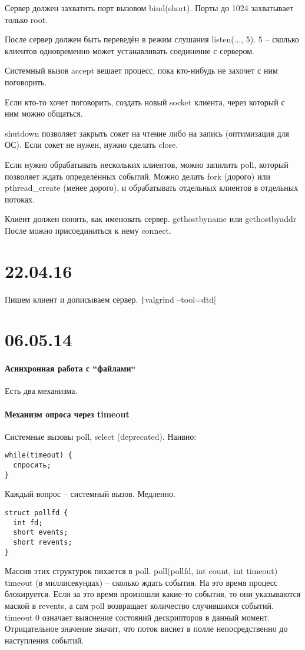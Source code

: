 \documentclass[a4paper,10pt]{article}
\newcommand{\bash}{\texttt}
\begin{document}
Сервер должен захватить порт вызовом bind(short). Порты до 1024 захватывает только root.

После сервер должен быть переведён в режим слушания listen(..., 5). 5 -- сколько клиентов одновременно может устанавливать соединение с сервером.

Системный вызов accept вешает процесс, пока кто-нибудь не захочет с ним поговорить.

Если кто-то хочет поговорить, создать новый socket клиента, через который с ним можно общаться.

shutdown позволяет закрыть сокет на чтение либо на запись (оптимизация для ОС).
Если сокет не нужен, нужно сделать close.

Если нужно обрабатывать нескольких клиентов, можно запилить poll, который позволяет ждать определённых событий. 
Можно делать fork (дорого) или pthread\_create (менее дорого), и обрабатывать отдельных клиентов в отдельных потоках.

Клиент должен понять, как именовать сервер.
gethostbyname или gethostbyaddr
После можно присоединиться к нему connect.

\section{22.04.16}
Пишем клиент и дописываем сервер.
\bash|valgrind --tool=dtd|

\section{06.05.14}
\paragraph{Асинхронная работа с ``файлами``}
Есть два механизма.
\paragraph{Механизм опроса через timeout}
Системные вызовы poll, select (deprecated).
Наивно:
\begin{verbatim}
while(timeout) {
  спросить;
}
\end{verbatim}
Каждый вопрос -- системный вызов. Медленно.
\begin{verbatim}
struct pollfd {
  int fd;
  short events;
  short revents;
}
\end{verbatim}
Массив этих структурок пихается в poll.
poll(pollfd, int count, int timeout)
timeout (в миллисекундах) -- сколько ждать события. На это время процесс блокируется. Если за это время произошли какие-то события, то они указываются маской в revents, а сам poll возвращает количество случившихся событий.
timeout 0 означает выяснение состояний дескрипторов в данный момент. Отрицательное значение значит, что поток виснет в полле непосредственно до наступления событий.
\end{document}
